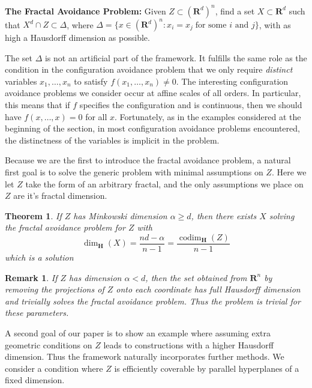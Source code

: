 \documentclass{article}
\theoremstyle{plain}
\theoremstyle{plain}
\newtheorem{theorem}{Theorem}
\newtheorem*{remark}{Remark}
\DeclareMathOperator{\codim}{codim}
\begin{document}
\begin{changemargin}{0.5em}{0em}
	{\bf The Fractal Avoidance Problem:} Given $Z \subset (\mathbf{R}^d)^n$, find a set $X \subset \mathbf{R}^d$ such that $X^d \cap Z \subset \Delta$, where $\Delta = \{ x \in (\mathbf{R}^d)^n : x_i = x_j\; \text{for some $i$ and $j$} \}$, with as high a Hausdorff dimension as possible.
\end{changemargin}

The set $\Delta$ is not an artificial part of the framework. It fulfills the same role as the condition in the configuration avoidance problem that we only require {\it distinct} variables $x_1, \dots, x_n$ to satisfy $f(x_1, \dots, x_n) \neq 0$. The interesting configuration avoidance problems we consider occur at affine scales of all orders. In particular, this means that if $f$ specifies the configuration and is continuous, then we should have $f(x,\dots,x) = 0$ for all $x$. Fortunately, as in the examples considered at the beginning of the section, in most configuration avoidance problems encountered, the distinctness of the variables is implicit in the problem.

Because we are the first to introduce the fractal avoidance problem, a natural first goal is to solve the generic problem with minimal assumptions on $Z$. Here we let $Z$ take the form of an arbitrary fractal, and the only assumptions we place on $Z$ are it's fractal dimension.

\begin{theorem}
	If $Z$ has Minkowski dimension $\alpha \geq d$, then there exists $X$ solving the fractal avoidance problem for $Z$ with
	\[ \dim_{\mathbf{H}}(X) = \frac{nd - \alpha}{n - 1} = \frac{\codim_{\mathbf{H}}(Z)}{n - 1} \]
	which is a solution 
\end{theorem}

\begin{remark}
	If $Z$ has dimension $\alpha < d$, then the set obtained from $\mathbf{R}^n$ by removing the projections of $Z$ onto each coordinate has full Hausdorff dimension and trivially solves the fractal avoidance problem. Thus the problem is trivial for these parameters.
\end{remark}

A second goal of our paper is to show an example where assuming extra geometric conditions on $Z$ leads to constructions with a higher Hausdorff dimension. Thus the framework naturally incorporates further methods. We consider a condition where $Z$ is efficiently coverable by parallel hyperplanes of a fixed dimension.
\end{document}
